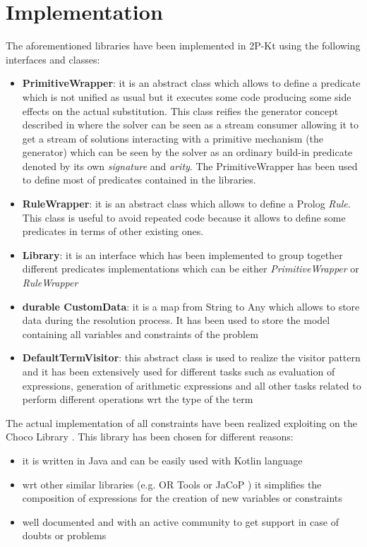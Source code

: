 \section{Implementation}\label{sec:Implementation}

The aforementioned libraries have been implemented in 2P-Kt using the following interfaces and classes:
\begin{itemize}
    \item \textbf{PrimitiveWrapper}: it is an abstract class which allows to define a predicate which is not unified as usual but it executes some code producing some
    side effects on the actual substitution. This class reifies the generator concept described in \cite{10.1007/978-3-030-75775-5_27}
    where the solver can be seen as a stream consumer allowing it to get a stream of solutions interacting with a primitive mechanism (the generator)
    which can be seen by the solver as an ordinary build-in predicate denoted by its own \textit{signature} and \textit{arity}. The PrimitiveWrapper has been used to define most of predicates contained in the libraries.
    \item \textbf{RuleWrapper}: it is an abstract class which allows to define a Prolog \textit{Rule}. This class is useful to avoid
    repeated code because it allows to define some predicates in terms of other existing ones.
    \item \textbf{Library}: it is an interface which has been implemented to group together different predicates implementations which
    can be either \textit{PrimitiveWrapper} or \textit{RuleWrapper}
    \item \textbf{durable CustomData}: it is a map from String to Any which allows to store data during the resolution process. It has been used to store the
    model containing all variables and constraints of the problem
    \item \textbf{DefaultTermVisitor}: this abstract class is used to realize the visitor pattern \cite{gamma1994design} and it has been
    extensively used for different tasks such as evaluation of expressions, generation of arithmetic expressions and all other tasks related to perform different operations wrt the type of the term
\end{itemize}


The actual implementation of all constraints have been realized exploiting on the Choco Library \cite{Prudhomme2022}. This library has been chosen for different reasons:
\begin{itemize}
    \item it is written in Java and can be easily used with Kotlin language
    \item wrt other similar libraries (e.g. OR Tools \cite{ortools} or JaCoP \cite{Kuchcinski2013JaCoPJ}) it simplifies the composition of expressions for the creation of new variables or constraints
    \item well documented and with an active community to get support in case of doubts or problems
\end{itemize}

